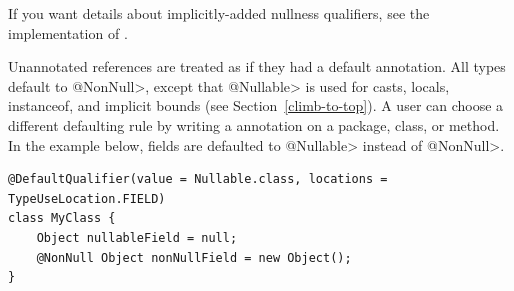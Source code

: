 If you want details about implicitly-added nullness qualifiers, see the
implementation of .




Unannotated references are treated as if they had a default annotation.
All types default to
\<@NonNull>, except that \<@Nullable> is used for casts, locals,
instanceof, and implicit bounds (see Section~\ref{climb-to-top}).
A user can choose a different defaulting
rule by writing a  annotation on a
 package, class, or method.  In the example below, fields are defaulted to
\<@Nullable> instead of \<@NonNull>.

\begin{Verbatim}
@DefaultQualifier(value = Nullable.class, locations = TypeUseLocation.FIELD)
class MyClass {
    Object nullableField = null;
    @NonNull Object nonNullField = new Object();
}
\end{Verbatim}


%


